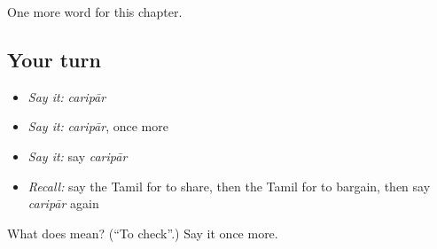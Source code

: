 \begin{grammarlens}[title={What you've built}]
One more word for this chapter.
\end{grammarlens}

\subsection*{Your turn}
\begin{itemize}
\raggedright
  \item \emph{Say it:} \emph{caripār}
  \item \emph{Say it:} \emph{caripār}, once more
  \item \emph{Say it:} say \emph{caripār}
  \item \emph{Recall:} say the Tamil for to share, then the Tamil for to bargain, then say \emph{caripār} again
\end{itemize}

\begin{tcolorbox}[breakable,colback=teal!4,colframe=teal!35!black,title={Before you move on}]
What does  mean? (\textquotedblleft{}To check\textquotedblright{}.) Say it once more.
\end{tcolorbox}
